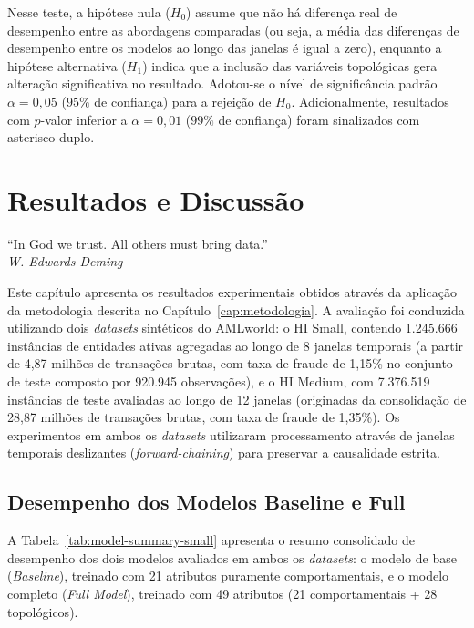 \documentclass[a4paper,12pt,oneside,onecolumn,final,fleqn]{repUERJ}
\begin{document}
Nesse teste, a hipótese nula ($H_0$) assume que não há diferença real de desempenho entre as abordagens comparadas (ou seja, a média das diferenças de desempenho entre os modelos ao longo das janelas é igual a zero), enquanto a hipótese alternativa ($H_1$) indica que a inclusão das variáveis topológicas gera alteração significativa no resultado. Adotou-se o nível de significância padrão $\alpha = 0{,}05$ ($95\%$ de confiança) para a rejeição de $H_0$. Adicionalmente, resultados com $p$-valor inferior a $\alpha = 0{,}01$ ($99\%$ de confiança) foram sinalizados com asterisco duplo.
\chapter{Resultados e Discussão}

\begin{epigrafeonline}
\hfill ``In God we trust. All others must bring data.''\hspace{0.2cm}\null\\
\hspace*{\fill}\textit{W. Edwards Deming}\\
\end{epigrafeonline}

Este capítulo apresenta os resultados experimentais obtidos através da aplicação da metodologia descrita no Capítulo~\ref{cap:metodologia}. A avaliação foi conduzida utilizando dois \textit{datasets} sintéticos do AMLworld: o HI Small, contendo 1.245.666 instâncias de entidades ativas agregadas ao longo de 8 janelas temporais (a partir de 4,87 milhões de transações brutas, com taxa de fraude de 1,15\% no conjunto de teste composto por 920.945 observações), e o HI Medium, com 7.376.519 instâncias de teste avaliadas ao longo de 12 janelas (originadas da consolidação de 28,87 milhões de transações brutas, com taxa de fraude de 1,35\%). Os experimentos em ambos os \textit{datasets} utilizaram processamento através de janelas temporais deslizantes (\textit{forward-chaining}) para preservar a causalidade estrita.

\section{Desempenho dos Modelos Baseline e Full}

A Tabela~\ref{tab:model-summary-small} apresenta o resumo consolidado de desempenho dos dois modelos avaliados em ambos os \textit{datasets}: o modelo de base (\textit{Baseline}), treinado com 21 atributos puramente comportamentais, e o modelo completo (\textit{Full Model}), treinado com 49 atributos (21 comportamentais + 28 topológicos).
\end{document}
